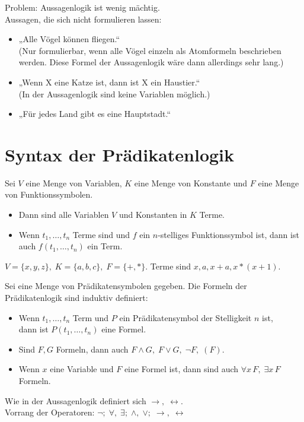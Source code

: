 Problem: Aussagenlogik ist wenig mächtig.\\
Aussagen, die sich nicht formulieren lassen:
\begin{itemize}
\item „Alle Vögel können fliegen.“\\
(Nur formulierbar, wenn alle Vögel einzeln als Atomformeln beschrieben werden. Diese Formel der Aussagenlogik wäre dann allerdings sehr lang.)
\item „Wenn X eine Katze ist, dann ist X ein Haustier.“\\
(In der Aussagenlogik sind keine Variablen möglich.)
\item „Für jedes Land gibt es eine Hauptstadt.“
\end{itemize}

\section{Syntax der Prädikatenlogik}
Sei $V$ eine Menge von Variablen, $K$ eine Menge von Konstante und $F$ eine Menge von Funktionssymbolen.
\begin{itemize}
\item Dann sind alle Variablen $V$ und Konstanten in $K$ Terme.
\item Wenn $t_1, \dots, t_n$ Terme sind und $f$ ein $n$-stelliges Funktionssymbol ist, dann ist auch $f(t_1, \dots, t_n)$ ein Term. 
\end{itemize}

$V=\{x,y,z\},\; K=\{a,b,c\},\; F=\{+,*\}$. Terme sind $x,a,x+a,x*(x+1)$.

Sei eine Menge von Prädikatensymbolen gegeben. Die Formeln der Prädikatenlogik sind induktiv definiert:
\begin{itemize}
\item Wenn $t_1, \dots, t_n$ Term und $P$ ein Prädikatensymbol der Stelligkeit $n$ ist,\\ dann ist $P(t_1, \dots, t_n)$ eine Formel.
\item Sind $F,G$ Formeln, dann auch $F\wedge G, \; F\vee G,\; \neg F,\; (F)$.
\item Wenn $x$ eine Variable und $F$ eine Formel ist, dann sind auch $\forall x \,F, \; \exists x\,F$ Formeln.
\end{itemize}

 Wie in der Aussagenlogik definiert sich $\to, \; \leftrightarrow$.\\
Vorrang der Operatoren: $\neg;\; \forall, \; \exists;\; \wedge, \; \vee;\; \to,\; \leftrightarrow$

